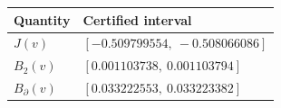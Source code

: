 \begin{tabular}{@{}ll@{}}\toprule
Quantity & Certified interval\\\midrule
$J(v)$ & $[-0.509799554,\ -0.508066086]$ \\
$B_2(v)$ & $[0.001103738,\ 0.001103794]$ \\
$B_\partial(v)$ & $[0.033222553,\ 0.033223382]$ \\
\bottomrule\end{tabular}
